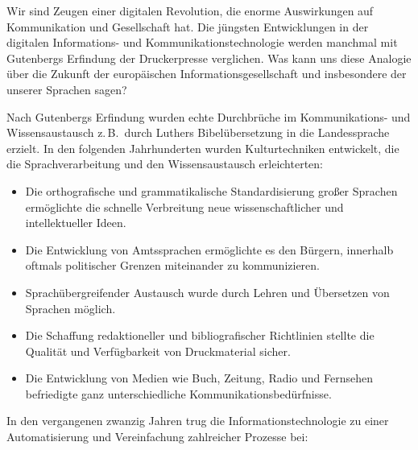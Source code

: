 \documentclass[]{../../metanetpaper}
\begin{document}
\clearpage



\begin{multicols}{2}

Wir sind Zeugen einer digitalen Revolution, die enorme Auswirkungen auf Kommunikation und Gesellschaft hat. Die jüngsten Entwicklungen in der digitalen In\-for\-ma\-tions- und Kommunikationstechnologie werden manchmal mit Gutenbergs Erfindung der Druckerpresse verglichen. Was kann uns diese Analogie über die Zukunft der europäischen Informationsgesellschaft und insbesondere der unserer Sprachen sagen?


Nach Gutenbergs Erfindung wurden echte Durchbrüche im Kom\-mu\-ni\-ka\-tions- und Wis\-sens\-aus\-tausch z.\,B.~durch Luthers Bibelübersetzung    in die Landessprache  erzielt. In den folgenden Jahrhunderten wurden Kulturtechniken entwickelt, die die Sprachverarbeitung und den Wissensaustausch erleichterten:

\medskip
\begin{itemize}
\item Die orthografische und grammatikalische Standardisierung großer Sprachen ermöglichte die schnelle Verbreitung neue wissenschaftlicher und intellektueller Ideen.
\item Die Entwicklung von Amtssprachen ermöglichte es den Bürgern, innerhalb oftmals politischer Grenzen miteinander zu kommunizieren.
\item Sprachübergreifender Austausch wurde durch Lehren und Übersetzen von Sprachen möglich.
\item Die Schaffung redaktioneller und bibliografischer Richtlinien stellte die Qualität und Verfügbarkeit von Druckmaterial sicher.
\medskip
\item Die Entwicklung von Medien wie Buch, Zeitung, Radio und Fernsehen befriedigte ganz unterschiedliche Kommunikationsbedürfnisse.
\end{itemize}

In den vergangenen zwanzig Jahren trug die Informationstechnologie zu einer Automatisierung und Vereinfachung zahlreicher Prozesse bei:


\end{multicols}
\end{document}

